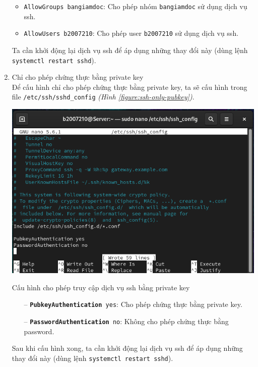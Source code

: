 \documentclass[a4paper, 11pt]{article}
\begin{document}
\begin{enumerate}
\begin{minipage}
              \caption{Cho phép nhóm \texttt{bangiamdoc} và user \texttt{b2007210} có quyền điều khiển máy tính từ xa}
              \label{figure:allow-groups-users}
          \end{minipage}
          \begin{itemize}
              \item \texttt{AllowGroups bangiamdoc}: Cho phép nhóm \texttt{bangiamdoc} sử dụng dịch vụ ssh.
              \item \texttt{AllowUsers b2007210}: Cho phép user \texttt{b2007210} sử dụng dịch vụ ssh.
          \end{itemize}

          Ta cần khởi động lại dịch vụ ssh để áp dụng những thay đổi này (dùng lệnh \texttt{systemctl restart sshd}).
    \item Chỉ cho phép chứng thực bằng private key \hfill \\
          Để cấu hình chỉ cho phép chứng thực bằng private key, ta sẽ cấu hình trong file \texttt{/etc/ssh/sshd\_config} \textit{(Hình \ref{figure:ssh-only-pubkey})}. \\
          \begin{minipage}
              {\linewidth}
              \captionsetup{type=figure}
              \centering
              \includegraphics[width=\linewidth]{images/ssh-only-pubkey.png}
              \caption{Cấu hình cho phép truy cập dịch vụ ssh bằng private key}
              \label{figure:ssh-only-pubkey}
          \end{minipage}
          \begin{itemize}
              \item[--] \texttt{\textbf{PubkeyAuthentication} yes}: Cho phép chứng thực bằng private key.
              \item[--] \texttt{\textbf{PasswordAuthentication} no}: Không cho phép chứng thực bằng password.
          \end{itemize}
          Sau khi cấu hình xong, ta cần khởi động lại dịch vụ ssh để áp dụng những thay đổi này (dùng lệnh \texttt{systemctl restart sshd}).


\end{enumerate}
\end{document}
